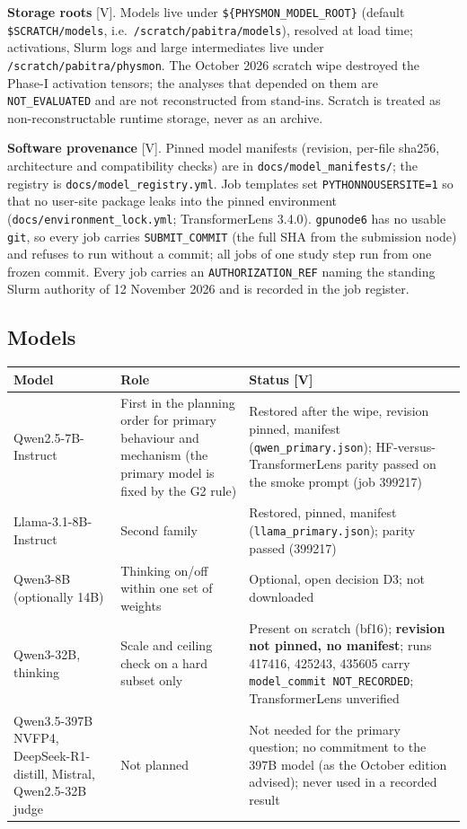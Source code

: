 \documentclass[10pt,a4paper]{article}
\newcommand{\tg}[1]{\textsc{[#1]}}
\newcommand{\NE}{\texttt{NOT\_EVALUATED}}
\begin{document}
\textbf{Storage roots} \tg{V}. Models live under \texttt{\$\{PHYSMON\_MODEL\_ROOT\}} (default
\texttt{\$SCRATCH/models}, i.e.\ \texttt{/scratch/pabitra/models}), resolved at load time; activations, Slurm logs
and large intermediates live under \texttt{/scratch/pabitra/physmon}. The October 2026 scratch wipe destroyed the
Phase-I activation tensors; the analyses that depended on them are \NE{} and are not reconstructed from
stand-ins. Scratch is treated as non-reconstructable runtime storage, never as an archive.

\textbf{Software provenance} \tg{V}. Pinned model manifests (revision, per-file sha256, architecture and
compatibility checks) are in \texttt{docs/model\_manifests/}; the registry is \texttt{docs/model\_registry.yml}.
Job templates set \texttt{PYTHONNOUSERSITE=1} so that no user-site package leaks into the pinned environment
(\texttt{docs/environment\_lock.yml}; TransformerLens 3.4.0). \texttt{gpunode6} has no usable \texttt{git}, so
every job carries \texttt{SUBMIT\_COMMIT} (the full SHA from the submission node) and refuses to run without a
commit; all jobs of one study step run from one frozen commit. Every job carries an
\texttt{AUTHORIZATION\_REF} naming the standing Slurm authority of 12 November 2026 and is recorded in the job
register.

\subsection{Models}
\label{sec:compute-models}

\begin{center}\small
\begin{tabularx}{\linewidth}{@{}P{3.4cm}P{3.6cm}L@{}}
\toprule
Model & Role & Status \tg{V} \\
\midrule
Qwen2.5-7B-Instruct & First in the planning order for primary behaviour and mechanism (the primary model is fixed by the G2 rule) & Restored after the wipe, revision pinned, manifest
(\texttt{qwen\_primary.json}); HF-versus-TransformerLens parity passed on the smoke prompt (job 399217) \\
Llama-3.1-8B-Instruct & Second family & Restored, pinned, manifest (\texttt{llama\_primary.json}); parity passed
(399217) \\
Qwen3-8B (optionally 14B) & Thinking on/off within one set of weights & Optional, open decision D3; not
downloaded \\
Qwen3-32B, thinking & Scale and ceiling check on a hard subset only & Present on scratch (bf16); \textbf{revision
not pinned, no manifest}; runs 417416, 425243, 435605 carry \texttt{model\_commit NOT\_RECORDED}; TransformerLens
unverified \\
Qwen3.5-397B NVFP4, DeepSeek-R1-distill, Mistral, Qwen2.5-32B judge & Not planned & Not needed for the primary
question; no commitment to the 397B model (as the October edition advised); never used in a recorded result \\
\bottomrule
\end{tabularx}
\end{center}
\end{document}
